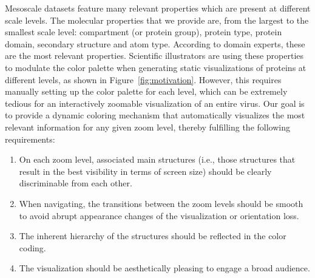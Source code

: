 \documentclass{egpubl}
\begin{document}
	Mesoscale datasets feature many relevant properties which are present at different scale levels.
	The molecular properties that we provide are, from the largest to the smallest scale level: compartment (or protein group), protein type, protein domain, secondary structure and atom type.
	According to domain experts, these are the most relevant properties. %
	Scientific illustrators are using these properties to modulate the color palette when generating static visualizations of proteins at different levels, as shown in Figure~\ref{fig:motivation}.
	However, this requires manually setting up the color palette for each level, which can be extremely tedious for an interactively zoomable visualization of an entire virus. 
	Our goal is to provide a dynamic coloring mechanism that automatically visualizes the most relevant information for any given zoom level, thereby fulfilling the following requirements: 
		
	\begin{enumerate}
		\item On each zoom level, associated main structures (i.e., those structures that result in the best visibility in terms of screen size) should be clearly discriminable from each other. 
		\item When navigating, the transitions between the zoom levels should be smooth to avoid abrupt appearance changes of the visualization or orientation loss. 
		\item The inherent hierarchy of the structures should be reflected in the color coding. 
		\item The visualization should be aesthetically pleasing to engage a broad audience. 
	\end{enumerate}
	
\end{document}
